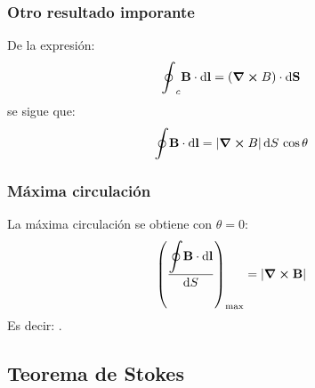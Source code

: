 \documentclass[12pt]{beamer}
\begin{document}
\begin{frame}
\frametitle{Otro resultado imporante}
De la expresión:
\pause
\begin{align*}
\scaleoint{6ex}_{c} \vb{B} \cdot \dd{\vb{l}} = (\curl{B}) \cdot \dd{\vb{S}}
\end{align*}
\pause
se sigue que:
\pause
\begin{align*}
\scaleoint{6ex} \vb{B} \cdot \dd{\vb{l}} = \abs{\curl{B}} \dd{S \, \cos \theta}
\end{align*}
\end{frame}
\begin{frame}
\frametitle{Máxima circulación}
La máxima circulación se obtiene con $\theta = 0$:
\pause
\begin{align*}
\left( \dfrac{\displaystyle \scaleoint{6ex} \vb{B} \cdot \dd{\vb{l}}}{\dd{S}} \right)_{\max} = \abs{\curl{\vb{B}}}
\end{align*}
Es decir: .
\end{frame}

\subsection{Teorema de Stokes}
\end{document}
